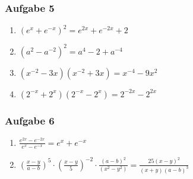 \subsubsection{Aufgabe 5} 
\begin{enumerate}
	\item \quad $ (e^x+e^{-x})^2 =e^{2x}+e^{-2x}+2 $	%
	\item \quad $ (a^2-a^{-2})^2 =a^4 - 2 +a^{-4} $		%
	\item \quad $ (x^{-2}-3x)(x^{-2}+3x) =x^{-4}-9x^2 $				%
	\item \quad $ (2^{-x}+2^x)(2^{-x}-2^x) =2^{-2x}-2^{2x} $		%
\end{enumerate}

\subsubsection{Aufgabe 6} 
\begin{enumerate}
	\item \quad $\frac{e^{2x}-e^{-2x}}{e^x-e^{-x}} = e^x + e^{-x} $	%
	\item \quad $\left(\frac{x-y}{a-b}\right)^5 \cdot \left(\frac{x-y}{5}\right)^{-2} \cdot \frac{(a-b)^2}{(x^2-y^2)}=\frac{25(x-y)^2}{(x+y)(a-b)^3} $									%
\end{enumerate}
\pagebreak
